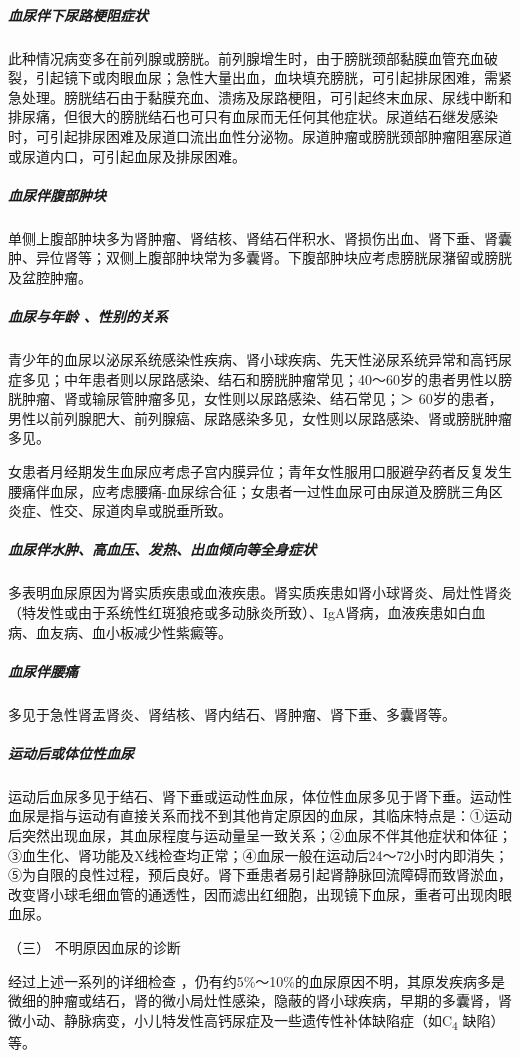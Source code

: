 \subparagraph{血尿伴下尿路梗阻症状}

此种情况病变多在前列腺或膀胱。前列腺增生时，由于膀胱颈部黏膜血管充血破裂，引起镜下或肉眼血尿；急性大量出血，血块填充膀胱，可引起排尿困难，需紧急处理。膀胱结石由于黏膜充血、溃疡及尿路梗阻，可引起终末血尿、尿线中断和排尿痛，但很大的膀胱结石也可只有血尿而无任何其他症状。尿道结石继发感染时，可引起排尿困难及尿道口流出血性分泌物。尿道肿瘤或膀胱颈部肿瘤阻塞尿道或尿道内口，可引起血尿及排尿困难。

\subparagraph{血尿伴腹部肿块}

单侧上腹部肿块多为肾肿瘤、肾结核、肾结石伴积水、肾损伤出血、肾下垂、肾囊肿、异位肾等；双侧上腹部肿块常为多囊肾。下腹部肿块应考虑膀胱尿潴留或膀胱及盆腔肿瘤。

\subparagraph{血尿与年龄 、性别的关系}

青少年的血尿以泌尿系统感染性疾病、肾小球疾病、先天性泌尿系统异常和高钙尿症多见；中年患者则以尿路感染、结石和膀胱肿瘤常见；40～60岁的患者男性以膀胱肿瘤、肾或输尿管肿瘤多见，女性则以尿路感染、结石常见；＞
60岁的患者，男性以前列腺肥大、前列腺癌、尿路感染多见，女性则以尿路感染、肾或膀胱肿瘤多见。

女患者月经期发生血尿应考虑子宫内膜异位；青年女性服用口服避孕药者反复发生腰痛伴血尿，应考虑腰痛-血尿综合征；女患者一过性血尿可由尿道及膀胱三角区炎症、性交、尿道肉阜或脱垂所致。

\subparagraph{血尿伴水肿、高血压、发热、出血倾向等全身症状}

多表明血尿原因为肾实质疾患或血液疾患。肾实质疾患如肾小球肾炎、局灶性肾炎（特发性或由于系统性红斑狼疮或多动脉炎所致）、IgA肾病，血液疾患如白血病、血友病、血小板减少性紫癜等。

\subparagraph{血尿伴腰痛}

多见于急性肾盂肾炎、肾结核、肾内结石、肾肿瘤、肾下垂、多囊肾等。

\subparagraph{运动后或体位性血尿}

运动后血尿多见于结石、肾下垂或运动性血尿，体位性血尿多见于肾下垂。运动性血尿是指与运动有直接关系而找不到其他肯定原因的血尿，其临床特点是：①运动后突然出现血尿，其血尿程度与运动量呈一致关系；②血尿不伴其他症状和体征；③血生化、肾功能及X线检查均正常；④血尿一般在运动后24～72小时内即消失；⑤为自限的良性过程，预后良好。肾下垂患者易引起肾静脉回流障碍而致肾淤血，改变肾小球毛细血管的通透性，因而滤出红细胞，出现镜下血尿，重者可出现肉眼血尿。

\hypertarget{text00037.htmlux5cux23CHP1-15-2-4-3}{}
（三） 不明原因血尿的诊断

经过上述一系列的详细检查
，仍有约5\%～10\%的血尿原因不明，其原发疾病多是微细的肿瘤或结石，肾的微小局灶性感染，隐蔽的肾小球疾病，早期的多囊肾，肾微小动、静脉病变，小儿特发性高钙尿症及一些遗传性补体缺陷症（如C\textsubscript{4}
缺陷）等。

